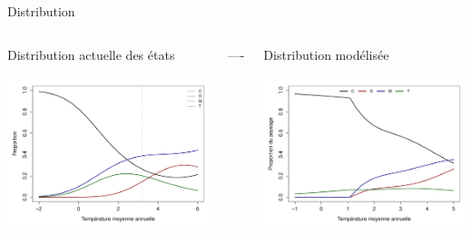 \documentclass{eecslides}
\begin{document}

		\begin{frame}{Distribution}
		\begin{columns}
			\begin{column}{0.5\textwidth}
				Distribution actuelle des états
								\begin{center}
					\includegraphics[height=0.5\textheight]{SDM}
				\end{center}
			\end{column}----
			\begin{column}{0.5\textwidth}
				Distribution modélisée
				\begin{center}
					\includegraphics[height=0.5\textheight]{SDMeq}
				\end{center}
			\end{column}
		\end{columns}	    	
	\end{frame}
\end{document}
